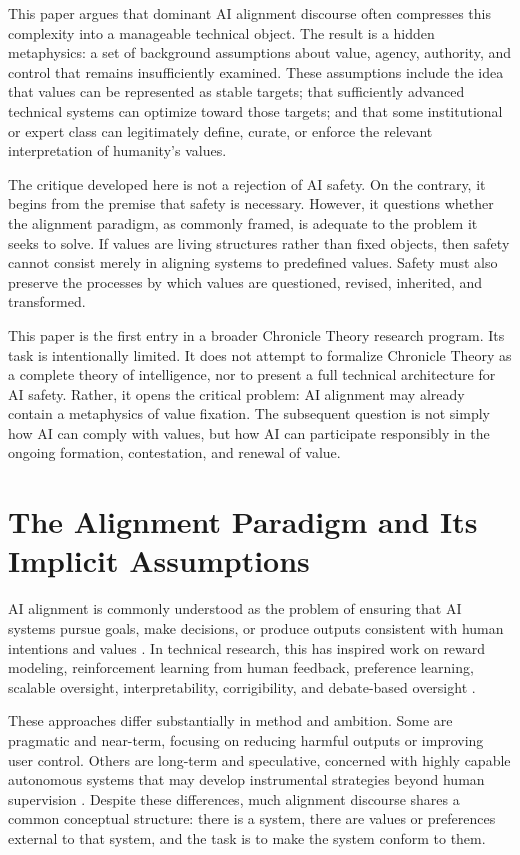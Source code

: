 \documentclass[11pt,a4paper]{article}
\begin{document}
This paper argues that dominant AI alignment discourse often compresses this complexity into a manageable technical object. The result is a hidden metaphysics: a set of background assumptions about value, agency, authority, and control that remains insufficiently examined. These assumptions include the idea that values can be represented as stable targets; that sufficiently advanced technical systems can optimize toward those targets; and that some institutional or expert class can legitimately define, curate, or enforce the relevant interpretation of humanity's values.

The critique developed here is not a rejection of AI safety. On the contrary, it begins from the premise that safety is necessary. However, it questions whether the alignment paradigm, as commonly framed, is adequate to the problem it seeks to solve. If values are living structures rather than fixed objects, then safety cannot consist merely in aligning systems to predefined values. Safety must also preserve the processes by which values are questioned, revised, inherited, and transformed.

This paper is the first entry in a broader Chronicle Theory research program. Its task is intentionally limited. It does not attempt to formalize Chronicle Theory as a complete theory of intelligence, nor to present a full technical architecture for AI safety. Rather, it opens the critical problem: AI alignment may already contain a metaphysics of value fixation. The subsequent question is not simply how AI can comply with values, but how AI can participate responsibly in the ongoing formation, contestation, and renewal of value.

\section{The Alignment Paradigm and Its Implicit Assumptions}

AI alignment is commonly understood as the problem of ensuring that AI systems pursue goals, make decisions, or produce outputs consistent with human intentions and values \parencite{christiano2018clarifying,gabriel2020alignment,russell2019human}. In technical research, this has inspired work on reward modeling, reinforcement learning from human feedback, preference learning, scalable oversight, interpretability, corrigibility, and debate-based oversight \parencite{hadfield2016cirl,irving2018debate,ngo2024alignment}.

These approaches differ substantially in method and ambition. Some are pragmatic and near-term, focusing on reducing harmful outputs or improving user control. Others are long-term and speculative, concerned with highly capable autonomous systems that may develop instrumental strategies beyond human supervision \parencite{bostrom2014superintelligence}. Despite these differences, much alignment discourse shares a common conceptual structure: there is a system, there are values or preferences external to that system, and the task is to make the system conform to them.
\end{document}
